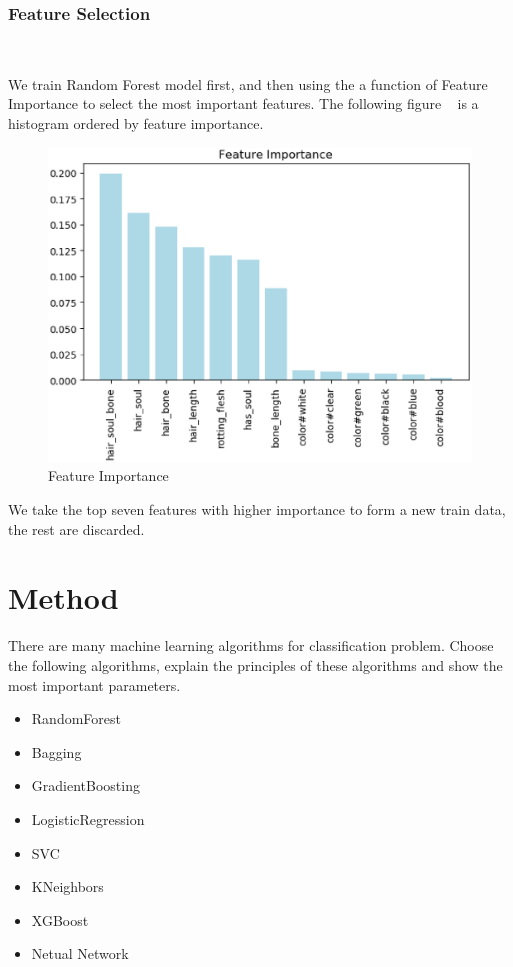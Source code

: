 \subsubsection{Feature Selection}
\

We train Random Forest model first, and
then using the a function of Feature Importance
to select the most important features. 
The following figure ~
is a histogram ordered by feature importance. 


\begin{figure}[htbp]
	\centering
	\includegraphics[scale=0.3]{figures/FEATURE.eps}
	\caption{Feature Importance}\label{fig:feature_importance}
\end{figure}

We take the top seven features 
with higher importance 
to form a new train data, the rest are discarded.


\section{Method}

There are many machine learning algorithms 
for classification problem. 
Choose the following algorithms, 
explain the principles of
these algorithms and 
show the most important parameters.

\begin{itemize}
	\item RandomForest 
	\item Bagging
	\item GradientBoosting
	\item LogisticRegression
	\item SVC
	\item KNeighbors 
	\item XGBoost
	\item Netual Network
\end{itemize}

